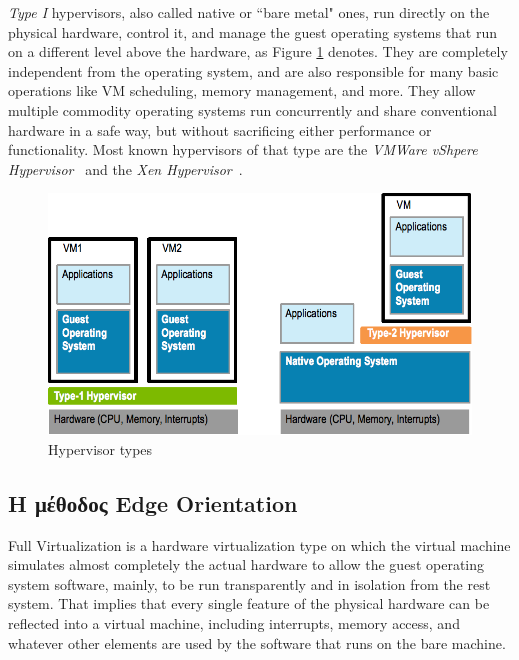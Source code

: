 \emph{Type I} hypervisors, also called native or ``bare metal" ones, run
directly on the physical hardware, control it, and manage the guest operating
systems that run on a different level above the hardware, as Figure
\ref{fig:hypervisors} denotes. They are completely independent from the
operating system, and are also responsible for many basic operations like VM
scheduling, memory management, and more. They allow
multiple commodity operating systems run concurrently and share conventional
hardware in a safe way, but without sacrificing either performance or
functionality. Most known hypervisors of that type are the \emph{VMWare vShpere
Hypervisor}~ and the
\emph{Xen Hypervisor}~\cite{xen_art}.

\begin{figure}[htbp]
  \begin{center}
    \includegraphics[width=0.8\maxwidth]{../figures/type1-vs-2.png}
    \caption{Hypervisor types\label{fig:hypervisors}}
   \end{center}
\end{figure}


\subsection{H μέθοδος Edge Orientation}

Full Virtualization is a hardware virtualization type on which the virtual
machine simulates almost completely the actual hardware to allow the guest
operating system software, mainly, to be run transparently and in isolation from
the rest system. That implies that every single feature of the physical hardware
can be reflected into a virtual machine, including interrupts, memory access,
and whatever other elements are used by the software that runs on the bare
machine.


